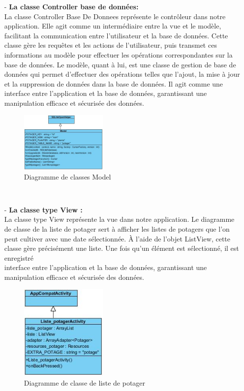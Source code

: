 \begin{itemize}
\item[-] \textbf{La classe Controller base de données: }\\
La classe Controller Base De Donnees représente le contrôleur dans notre application. Elle agit comme un intermédiaire entre la vue et le modèle, facilitant la communication entre l'utilisateur et la base de données. Cette classe gère les requêtes et les actions de l'utilisateur, puis transmet ces informations au modèle pour effectuer les opérations correspondantes sur la base de données. Le modèle, quant à lui, est une classe de gestion de base de données qui permet d'effectuer des opérations telles que l'ajout, la mise à jour et la suppression de données dans la base de données. Il agit comme une interface entre l'application et la base de données, garantissant une manipulation efficace et sécurisée des données.\\
\begin{figure}[!h]
    	\center
    		\includegraphics[width=0.4\textwidth]{image/diagrame2/Model.jpg}
   		\caption{Diagramme de classes Model}
    	\label{Diagramme de classes Model}
	\end{figure}\\
\item[-] \textbf{La classe type View : }\\
La classe type View représente la vue dans notre application. Le diagramme de classe de la liste de potager sert à afficher les listes de potagers que l’on peut cultiver avec une date sélectionnée. À l'aide de l'objet ListView, cette classe gère précisément une liste. Une fois qu'un élément est sélectionné, il  est enregistré\\
interface entre l'application et la base de données, garantissant une manipulation efficace et sécurisée des données.\\
	\begin{figure}[!h]
    	\center
    		\includegraphics[width=0.4\textwidth]{image/diagrame2/Liste_potagerActivity.jpg}
   		\caption{Diagramme de classe de liste de potager}
    	\label{Diagramme de classe de liste de potager}
	\end{figure}\\
\end{itemize}

